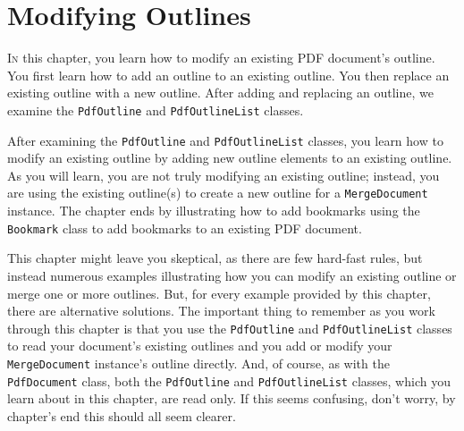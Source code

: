 \documentclass[american]{tufte-book}
\numberwithin{equation}{section}
\numberwithin{figure}{section}
\def\color#1{}%
\begin{document}
{{\chapter{Modifying Outlines}\label{chap:Modifying-Outlines}
\color{black}
\BgThispage
\vspace{8.00em}
\lettrine[lines=2,lhang=0.1]{I}{n} this chapter, you learn how to modify an existing PDF document's
outline. You first learn how to add an outline to an existing outline.
You then replace an existing outline with a new outline. After adding
and replacing an outline, we examine the \texttt{PdfOutline} and \texttt{PdfOutlineList}
classes. 

After examining the \texttt{PdfOutline} and \texttt{PdfOutlineList}
classes, you learn how to modify an existing outline by adding new
outline elements to an existing outline. As you will learn, you are
not truly modifying an existing outline; instead, you are using the
existing outline(s) to create a new outline for a \texttt{MergeDocument}
instance. The chapter ends by illustrating how to add bookmarks using
the \texttt{Bookmark} class to add bookmarks to an existing PDF document. 

This chapter might leave you skeptical, as there are few hard-fast
rules, but instead numerous examples illustrating how you can modify
an existing outline or merge one or more outlines. But, for every
example provided by this chapter, there are alternative solutions. 
The important thing to remember as you work through this chapter is
that you use the \texttt{PdfOutline} and \texttt{PdfOutlineList} classes
to read your document's existing outlines and you add or modify your
\texttt{MergeDocument} instance's outline directly.
And, of course, as with the \texttt{PdfDocument} class, both the
\texttt{PdfOutline} and \texttt{PdfOutlineList} classes, which you
learn about in this chapter, are read only. If this seems confusing,
don't worry, by chapter's end this should all seem clearer. 

}}
\end{document}

